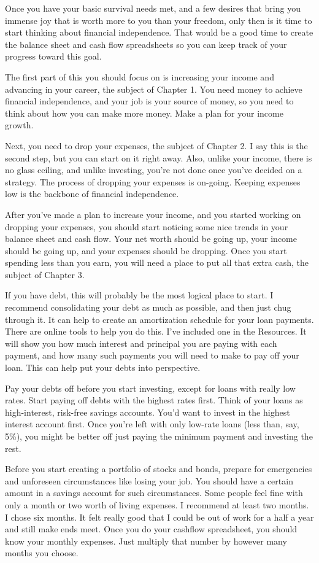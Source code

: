Once you have your basic survival needs met, and a few desires that bring you immense joy that is worth more to you than your freedom, only then is it time to start thinking about financial independence. That would be a good time to create the balance sheet and cash flow spreadsheets so you can keep track of your progress toward this goal.

The first part of this you should focus on is increasing your income and advancing in your career, the subject of Chapter 1. You need money to achieve financial independence, and your job is your source of money, so you need to think about how you can make more money. Make a plan for your income growth.

Next, you need to drop your expenses, the subject of Chapter 2. I say this is the second step, but you can start on it right away. Also, unlike your income, there is no glass ceiling, and unlike investing, you're not done once you've decided on a strategy. The process of dropping your expenses is on-going. Keeping expenses low is the backbone of financial independence.

After you've made a plan to increase your income, and you started working on dropping your expenses, you should start noticing some nice trends in your balance sheet and cash flow. Your net worth should be going up, your income should be going up, and your expenses should be dropping. Once you start spending less than you earn, you will need a place to put all that extra cash, the subject of Chapter 3.

If you have debt, this will probably be the most logical place to start. I recommend consolidating your debt as much as possible, and then just chug through it. It can help to create an amortization schedule for your loan payments. There are online tools to help you do this. I've included one in the Resources. It will show you how much interest and principal you are paying with each payment, and how many such payments you will need to make to pay off your loan. This can help put your debts into perspective.

Pay your debts off before you start investing, except for loans with really low rates. Start paying off debts with the highest rates first. Think of your loans as high-interest, risk-free savings accounts. You'd want to invest in the highest interest account first. Once you're left with only low-rate loans (less than, say, 5\%), you might be better off just paying the minimum payment and investing the rest.

Before you start creating a portfolio of stocks and bonds, prepare for emergencies and unforeseen circumstances like losing your job. You should have a certain amount in a savings account for such circumstances. Some people feel fine with only a month or two worth of living expenses. I recommend at least two months. I chose six months. It felt really good that I could be out of work for a half a year and still make ends meet. Once you do your cashflow spreadsheet, you should know your monthly expenses. Just multiply that number by however many months you choose.

